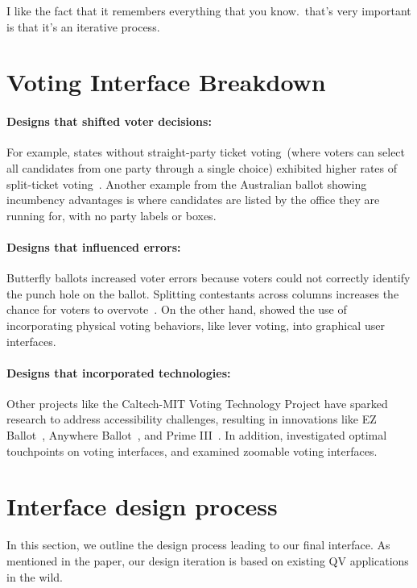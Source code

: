 \begin{displayquote}
I like the fact that it remembers everything that you know.~\bracketellipsis that's very important is that it's an iterative process.\hfill{}
\end{displayquote}


\section{Voting Interface Breakdown}\label{apdx:relatedVoting}
\paragraph{Designs that shifted voter decisions: } For example, states without straight-party ticket voting~(where voters can select all candidates from one party through a single choice) exhibited higher rates of split-ticket voting~\cite{engstrom2020politics}. Another example from the Australian ballot showing incumbency advantages is where candidates are listed by the office they are running for, with no party labels or boxes.
\paragraph{Designs that influenced errors: } Butterfly ballots increased voter errors because voters could not correctly identify the punch hole on the ballot. Splitting contestants across columns increases the chance for voters to overvote~\cite{quesenberyOpinionGoodDesign2020}. On the other hand, \textcite{everettElectronicVotingMachines2008} showed the use of incorporating physical voting behaviors, like lever voting, into graphical user interfaces.
\paragraph{Designs that incorporated technologies: } Other projects like the Caltech-MIT Voting Technology Project have sparked research to address accessibility challenges, resulting in innovations like EZ Ballot~\cite{leeUniversalDesignBallot2016}, Anywhere Ballot~\cite{summers2014making}, and Prime III~\cite{dawkinsPrimeIIIInnovative2009}. In addition, \textcite{gilbertAnomalyDetectionElectronic2013} investigated optimal touchpoints on voting interfaces, and \textcite{conradElectronicVotingEliminates2009} examined zoomable voting interfaces.


\section{Interface design process}\label{apdx:design}
In this section, we outline the design process leading to our final interface. As mentioned in the paper, our design iteration is based on existing QV applications in the wild.


